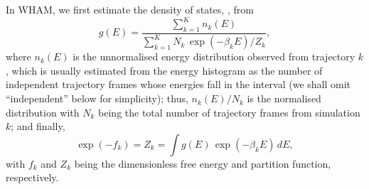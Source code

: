 \documentclass{gMOS2e}
\begin{document}
In WHAM,
we first estimate the density of states,
, from
%
\begin{equation}
g(E)
=
\frac{
  \sum_{k = 1}^K n_k(E)
}
{
  \sum_{k = 1}^K N_k \, \exp(-\beta_k E) / Z_k
},
\label{eq:gE_WHAM}
\end{equation}
%
where
$n_k(E)$
is
the unnormalised energy distribution
observed from trajectory $k$,
which
is usually estimated
from the energy histogram as
the number of independent trajectory frames
whose energies fall in the interval
(we shall omit ``independent'' below for simplicity);
%
{
thus, $n_k(E)/N_k$
is the normalised distribution
with $N_k$ being
the total number of trajectory frames
from simulation $k$;
}
%
and finally,
%
\begin{equation}
\exp( - f_k )
=
Z_k
=
\int g(E) \, \exp(-\beta_k E) \, dE,
\label{eq:Z}
\end{equation}
with
$f_k$
and
$Z_k$
being
the dimensionless free energy
and
partition function,
respectively.
\end{document}
